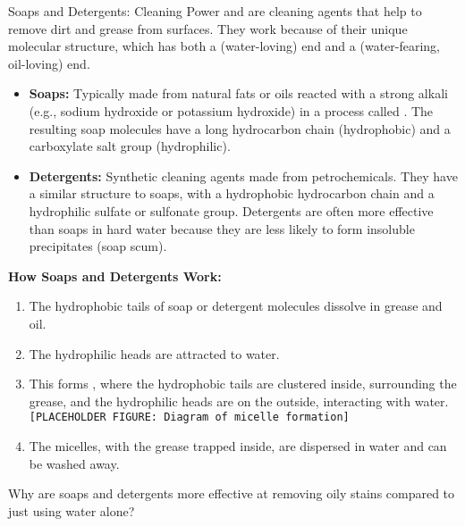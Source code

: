 \begin{keyconcept}{Soaps and Detergents: Cleaning Power}
 and  are cleaning agents that help to remove dirt and grease from surfaces. They work because of their unique molecular structure, which has both a  (water-loving) end and a  (water-fearing, oil-loving) end.

\begin{itemize}
    \item \textbf{Soaps:}  Typically made from natural fats or oils reacted with a strong alkali (e.g., sodium hydroxide or potassium hydroxide) in a process called .  The resulting soap molecules have a long hydrocarbon chain (hydrophobic) and a carboxylate salt group (hydrophilic).
    \item \textbf{Detergents:}  Synthetic cleaning agents made from petrochemicals.  They have a similar structure to soaps, with a hydrophobic hydrocarbon chain and a hydrophilic sulfate or sulfonate group.  Detergents are often more effective than soaps in hard water because they are less likely to form insoluble precipitates (soap scum).
\end{itemize}

\textbf{How Soaps and Detergents Work:}
\begin{enumerate}
    \item The hydrophobic tails of soap or detergent molecules dissolve in grease and oil.
    \item The hydrophilic heads are attracted to water.
    \item This forms , where the hydrophobic tails are clustered inside, surrounding the grease, and the hydrophilic heads are on the outside, interacting with water.  \texttt{[PLACEHOLDER FIGURE: Diagram of micelle formation]}
    \item The micelles, with the grease trapped inside, are dispersed in water and can be washed away.
\end{enumerate}
\end{keyconcept}

\begin{stopandthink}
Why are soaps and detergents more effective at removing oily stains compared to just using water alone?
\end{stopandthink}

